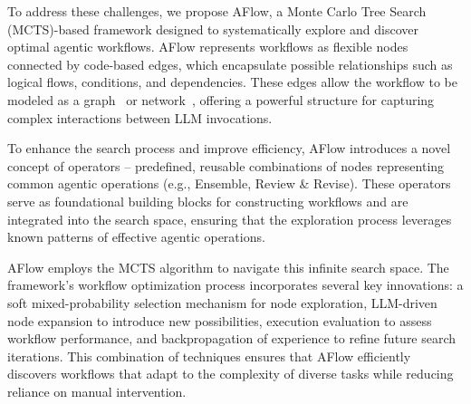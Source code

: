\documentclass{article} %
\newcommand{\model}{{\sc AFlow}\xspace}
\newcommand{\modelbold}{\textbf{\textsc{AFlow}}\xspace}
\theoremstyle{plain}
\theoremstyle{definition}
\theoremstyle{remark}
\begin{document}
To address these challenges, we propose \model, a Monte Carlo Tree Search (MCTS)-based framework designed to systematically explore and discover optimal agentic workflows. \model represents workflows as flexible nodes connected by code-based edges, which encapsulate possible relationships such as logical flows, conditions, and dependencies. These edges allow the workflow to be modeled as a graph~\citep{zhuge2024gptswarm} or network~\citep{liu2023dynamic}, offering a powerful structure for capturing complex interactions between LLM invocations.

To enhance the search process and improve efficiency, \model introduces a novel concept of operators -- 
 predefined, reusable combinations of nodes representing common agentic operations (e.g., Ensemble, Review \& Revise). These operators serve as foundational building blocks for constructing workflows and are integrated into the search space, ensuring that the exploration process leverages known patterns of effective agentic operations.

\model employs the MCTS algorithm to navigate this infinite search space. The framework’s workflow optimization process incorporates several key innovations: a soft mixed-probability selection mechanism for node exploration, LLM-driven node expansion to introduce new possibilities, execution evaluation to assess workflow performance, and backpropagation of experience to refine future search iterations. This combination of techniques ensures that \model efficiently discovers workflows that adapt to the complexity of diverse tasks while reducing reliance on manual intervention.

\end{document}
